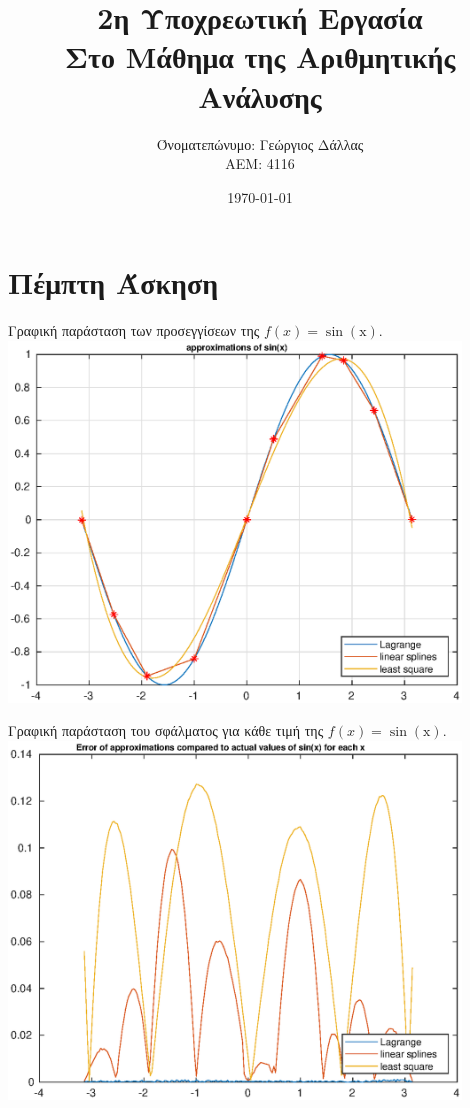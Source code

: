\documentclass[a4paper,11pt]{article}
\title{2η Υποχρεωτική Εργασία\\
Στο Μάθημα της Αριθμητικής Ανάλυσης} %
\author{Όνοματεπώνυμο: Γεώργιος Δάλλας  \\  ΑΕΜ: 4116}       %
\date{\today}                                      %
\begin{document}

\maketitle

\section{Πέμπτη Άσκηση}

\begin{center}
    Γραφική παράσταση των προσεγγίσεων της $f(x)=\mathrm{\sin\left(x\right)}$.
    \includegraphics[width=12cm]{sinx.eps}
\end{center}
\newpage
\begin{center}
    Γραφική παράσταση του σφάλματος για κάθε τιμή της $f(x)=\mathrm{\sin\left(x\right)}$.
    \includegraphics[width=12cm]{sinx-error.eps}\\
\end{center}
\end{document}
